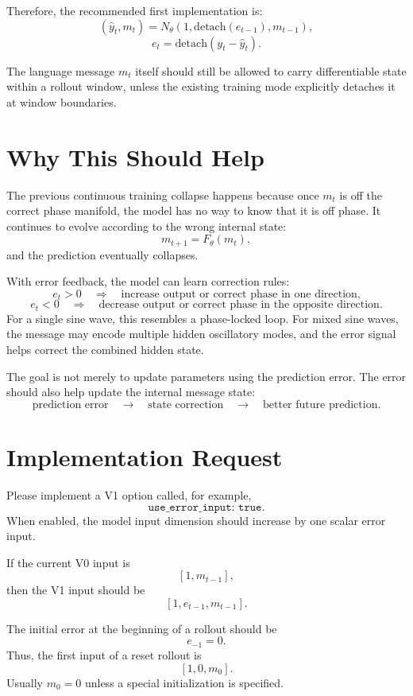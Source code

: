 \documentclass[11pt]{article}
\begin{document}
Therefore, the recommended first implementation is:
\[
(\hat y_t, m_t) = N_\theta(1, \mathrm{detach}(e_{t-1}), m_{t-1}),
\]
\[
e_t = \mathrm{detach}(y_t - \hat y_t).
\]

The language message $m_t$ itself should still be allowed to carry differentiable state within a rollout window, unless the existing training mode explicitly detaches it at window boundaries.

\section{Why This Should Help}

The previous continuous training collapse happens because once $m_t$ is off the correct phase manifold, the model has no way to know that it is off phase. It continues to evolve according to the wrong internal state:
\[
m_{t+1} = F_\theta(m_t),
\]
and the prediction eventually collapses.

With error feedback, the model can learn correction rules:
\[
e_t > 0
\quad\Rightarrow\quad
\text{increase output or correct phase in one direction,}
\]
\[
e_t < 0
\quad\Rightarrow\quad
\text{decrease output or correct phase in the opposite direction.}
\]
For a single sine wave, this resembles a phase-locked loop. For mixed sine waves, the message may encode multiple hidden oscillatory modes, and the error signal helps correct the combined hidden state.

The goal is not merely to update parameters using the prediction error. The error should also help update the internal message state:
\[
\text{prediction error}
\quad\longrightarrow\quad
\text{state correction}
\quad\longrightarrow\quad
\text{better future prediction}.
\]

\section{Implementation Request}

Please implement a V1 option called, for example,
\[
\texttt{use\_error\_input: true}.
\]
When enabled, the model input dimension should increase by one scalar error input.

If the current V0 input is
\[
[1, m_{t-1}],
\]
then the V1 input should be
\[
[1, e_{t-1}, m_{t-1}].
\]

The initial error at the beginning of a rollout should be
\[
e_{-1} = 0.
\]
Thus, the first input of a reset rollout is
\[
[1, 0, m_0].
\]
Usually $m_0 = 0$ unless a special initialization is specified.
\end{document}
